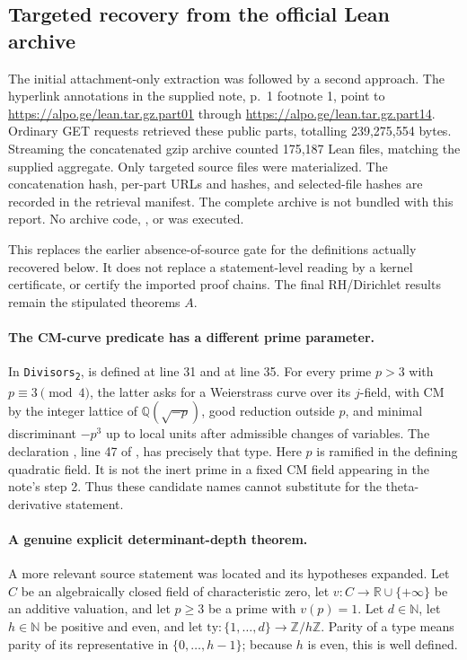 \documentclass[11pt,a4paper]{article}
\theoremstyle{definition}
\begin{document}
\subsection{Targeted recovery from the official Lean archive}
\label{sec:alpoge-official}

The initial attachment-only extraction was followed by a second approach.
The hyperlink annotations in the supplied note, p.~1 footnote 1, point to
\url{https://alpo.ge/lean.tar.gz.part01} through
\url{https://alpo.ge/lean.tar.gz.part14}.  Ordinary GET requests retrieved
these public parts, totalling 239,275,554 bytes.  Streaming the concatenated
gzip archive counted 175,187 Lean files, matching the supplied aggregate.
Only targeted source files were materialized.  The concatenation hash,
per-part URLs and hashes, and selected-file hashes are recorded in the
retrieval manifest.  The complete archive is not bundled with this report.
No archive code, , or  was executed.

This replaces the earlier absence-of-source gate for the definitions
actually recovered below.  It does not replace a statement-level reading
by a kernel certificate, or certify the imported proof chains.  The final
RH/Dirichlet results remain the stipulated theorems \(A\).

\paragraph{The CM-curve predicate has a different prime parameter.}
In
\texttt{Divisors\textsubscript{2}},
 is defined at line 31 and
 at line 35.  For every prime
\(p>3\) with \(p\equiv3\pmod4\), the latter asks for a Weierstrass
curve over its \(j\)-field, with CM by the integer lattice of
\(\mathbb Q(\sqrt{-p})\), good reduction outside \(p\), and minimal
discriminant \(-p^3\) up to local units after admissible changes of variables.
The declaration
, line 47 of
,
has precisely that type.  Here \(p\) is ramified in the defining quadratic
field.  It is not the inert prime in a fixed CM field appearing in the
note's step 2.  Thus these candidate names cannot substitute for the
theta-derivative statement.

\paragraph{A genuine explicit determinant-depth theorem.}
A more relevant source statement was located and its hypotheses expanded.
Let \(C\) be an algebraically closed field of characteristic zero, let
\(v:C\to\mathbb R\cup\{+\infty\}\) be an additive valuation, and
let \(p\geq3\) be a prime with \(v(p)=1\).  Let \(d\in\mathbb N\),
let \(h\in\mathbb N\) be positive and even, and let
\(\mathrm{ty}:\{1,\ldots,d\}\to\mathbb Z/h\mathbb Z\).
Parity of a type means parity of its representative in
\(\{0,\ldots,h-1\}\); because \(h\) is even, this is well defined.
\end{document}
